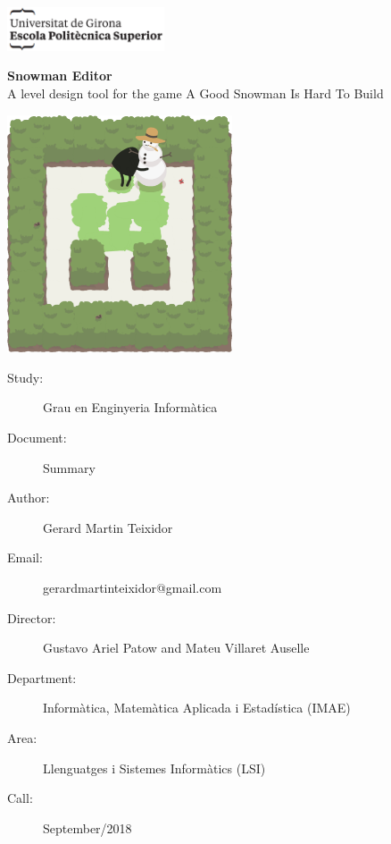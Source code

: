 \documentclass{report}
\theoremstyle{plain}
\begin{document}
\begin{titlepage}
\includegraphics[width=0.35\textwidth]{logo-politecnica.png}

\vspace{3\baselineskip}

\begin{center}
\fontsize{30pt}{30pt}\selectfont \textbf{Snowman Editor} \\ 
\huge A level design tool for the game A Good Snowman Is Hard To Build

\vspace{1\baselineskip}

\includegraphics[width=0.5\textwidth]{game-image-2.png}
\vspace*{\fill}

\end{center}

\begin{description}
    \item[Study:] Grau en Enginyeria Informàtica
    \item[Document:] Summary
    \item[Author:] Gerard Martin Teixidor
    \item[Email:] gerardmartinteixidor@gmail.com
    \item[Director:] Gustavo Ariel Patow and Mateu Villaret Auselle
    \item[Department:] Informàtica, Matemàtica Aplicada i Estadística (IMAE)
    \item[Area:] Llenguatges i Sistemes Informàtics (LSI)
    \item[Call:] September/2018
\end{description}
\end{titlepage}
\end{document}
